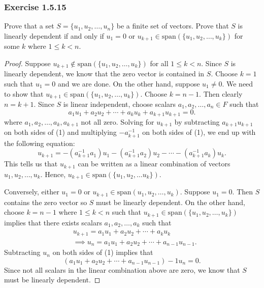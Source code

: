 \subsubsection{Exercise 1.5.15} Prove that a set \( S = \{ u_{1} , u_{2}, \dots, u_{n} \}   \) be a finite set of vectors. Prove that \( S  \) is linearly dependent if and only if \( u_{1} = 0  \)  or \( u_{k+1} \in \text{span}(\{ u_{1}, u_{2}, \dots, u_{k } \} ) \) for some \( k  \) where \( 1 \leq k < n  \). 
\begin{proof}
Suppose  \( u_{k+1} \notin \text{span}(\{ u_{1} , u_{2}, \dots, u_{k }  \} ) \) for all \( 1 \leq k < n \). Since \( S  \) is linearly dependent, we know that the zero vector is contained in \( S  \). Choose \( k =1  \) such that \( u_{1} = 0  \) and we are done. On the other hand, suppose \( u_{1} \neq 0  \). We need to show that \( u_{k+1} \in \text{span}(\{ u_{1} , u_{2} , \dots, u_{k } \} ) \). Choose \( k = n -1  \). Then clearly \( n = k + 1  \). Since \( S  \) is linear independent, choose scalars \( a_{1} , a_{2}, \dots, a_{n} \in F   \) such that
\[ a_{1} u_{1} + a_{2} u_{2} + \cdots + a_{k } u_{k } + a_{k+1}u_{k+1} = 0.    \tag{1}\]
where \( a_{1}, a_{2} , \dots, a_{k } ,  a_{k+1} \) not all zero. Solving for \( u_{k+1}  \) by subtracting \( a_{k+1} u_{k+1} \) on both sides of (1) and multiplying \( -a^{-1}_{k+1}  \) on both sides of (1), we end up with the following equation:
\[ u_{k+1} = - (a^{-1}_{k+1} a_{1})  u_{1} - ( a^{-1}_{k+1} a_{2} ) u_{2}  - \cdots -  ( a^{-1}_{k+1} a_{k}    ) u_{k}.    \]
This tells us that \( u_{k+1} \) can be written as a linear combination of vectors  \( u_{1}, u_{2}, \dots, u_{k}   \). Hence, \( u_{k+1} \in \text{span}(\{ u_{1}, u_{2}, \dots u_{k} \} ) \).

Conversely, either \( u_{1} = 0  \) or \( u_{k+1} \in \text{span}(u_{1}, u_{2}, \dots, u_{k} ) \). Suppose \( u_{1} = 0  \). Then \( S  \) contains the zero vector so \( S  \) must be linearly dependent. On the other hand, choose \( k = n-1  \) where \( 1 \leq k < n  \) such that  \( u_{k+1} \in \text{span}(\{ u_{1}, u_{2}, \dots, u_{k } \} ) \) implies that there exists scalars \( a_{1}, a_{2}, \dots, a_{k }  \) such that 
\begin{align*} 
    &u_{k+1} = a_{1} u_{1} + a_{2} u_{2} + \cdots + a_{k } u_{k } \\ 
    &\implies u_{n} = a_{1} u_{1} + a_{2} u_{2} + \cdots + a_{n-1} u_{n-1}. \tag{1}
\end{align*}
Subtracting \( u_{n}  \) on both sides of (1) implies that
\[ ( a_{1} u_{1} + a_{2} u_{2} + \cdots + a_{n-1} u_{n-1} ) - 1  u_{n} = 0.   \]
Since not all scalars in the linear combination above are zero, we know that \( S  \) must be linearly dependent.

\end{proof}

